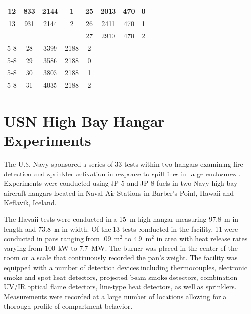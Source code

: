\begin{table}[h!]
\begin{center}
\begin{tabular}{|c|c|c|c||c|c|c|c|}
12      & 833       & 2144          & 1         & 25      & 2013      & 470           & 0                 \\ \hline
13      & 931       & 2144          & 2         & 26      & 2411      & 470           & 1                 \\ \hline
\multicolumn{4}{|r||}{}                         & 27      & 2910      & 470           & 2                 \\ \cline{5-8}
\multicolumn{4}{|r||}{}                         & 28      & 3399      & 2188          & 2                 \\ \cline{5-8}
\multicolumn{4}{|r||}{}                         & 29      & 3586      & 2188          & 0                 \\ \cline{5-8}
\multicolumn{4}{|r||}{}                         & 30      & 3803      & 2188          & 1                 \\ \cline{5-8}
\multicolumn{4}{|r||}{}                         & 31      & 4035      & 2188          & 2                 \\ \hline
\end{tabular}
\end{center}
\label{UL_NIST_Table}
\end{table}

\FloatBarrier

\section{USN High Bay Hangar Experiments}

The U.S. Navy sponsored a series of 33 tests within two hangars examining fire detection and sprinkler activation in response to spill fires in large enclosures \cite{Gott:1997, Davis:2000}. Experiments were conducted using JP-5 and JP-8 fuels in two Navy high bay aircraft hangars located in Naval Air Stations in Barber's Point, Hawaii and Keflavik, Iceland.

The Hawaii tests were conducted in a 15~m high hangar measuring 97.8~m in length and 73.8~m in width. Of the 13 tests conducted in the facility, 11 were conducted in pans ranging from .09~m$^2$ to 4.9~m$^2$ in area with heat release rates varying from 100~kW to 7.7~MW. The burner was placed in the center of the room on a scale that continuously recorded the pan's weight. The facility was equipped with a number of detection devices including thermocouples, electronic smoke and spot heat detectors, projected beam smoke detectors, combination UV/IR optical flame detectors, line-type heat detectors, as well as sprinklers. Measurements were recorded at a large number of locations allowing for a thorough profile of compartment behavior.

